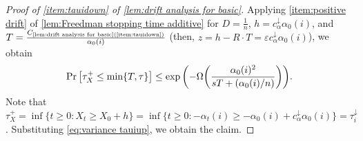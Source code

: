 \documentclass[letterpaper,11pt]{article}
\newcommand{\constrefs}[2]{C_{\mbox{\tiny\ref{#1}(\ref{#2})}}}
\newcommand{\calphadown}{c^{\downarrow}_\alpha}
\newcommand{\bounded}{D}
\newcommand{\variance}{s}
\newcommand{\tauidown}{\tau^{\downarrow}_i}
\newcommand{\drift}{R}
\newcommand{\tauxplus}{\tau_X^+}
\begin{document}
\begin{proof}[Proof of \cref{item:tauidown} of \cref{lem:drift analysis for basic}]
    Applying \cref{item:positive drift} of \cref{lem:Freedman stopping time additive} for $\bounded = \frac 1 n$, $h=\calphadown \alpha_0(i)$, and $T=\frac{\constrefs{lem:drift analysis for basic}{item:tauidown}}{\alpha_0(i)}$ (then, $z=h-\drift\cdot T=\varepsilon \calphadown \alpha_0(i)$),
    we obtain
    \begin{align*}
        \Pr\qty[\tauxplus\leq \min\{T,\tau\}]
        \leq\exp\qty( -\Omega\qty(\frac{\alpha_0(i)^2}{ \variance T + (\alpha_0(i)/n) }) ).
    \end{align*}
    Note that $\tauxplus=\inf\{t\geq 0: X_t\geq X_0+h\}=\inf\{t\geq 0: -\alpha_t(i)\geq -\alpha_0(i)+\calphadown \alpha_0(i)\}=\tauidown$.
    Substituting \cref{eq:variance tauiup}, we obtain the claim.

  \end{proof}
\end{document}
